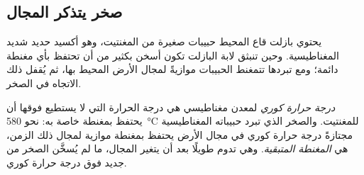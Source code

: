\subsection{صخر يتذكر المجال}

يحتوي بازلت قاع المحيط حبيبات صغيرة من المغنتيت، وهو أكسيد
حديد شديد المغناطيسية. وحين تنبثق لابة البازلت تكون أسخن بكثير من أن
تحتفظ بأي مغنطة دائمة؛ ومع تبردها تتمغنط الحبيبات
موازيةً لمجال الأرض المحيط بها، ثم يُقفل ذلك الاتجاه
في الصخر.

\begin{definition}\label{def:g11:drift-to-spreading:remanence}
\emph{درجة حرارة كوري} لمعدن مغناطيسي هي
درجة الحرارة التي لا يستطيع فوقها أن يحتفظ بمغنطة خاصة به: نحو
\qty{580}{\celsius} للمغنتيت. والصخر الذي تبرد حبيباته المغناطيسية مجتازةً
درجة حرارة كوري في مجال الأرض يحتفظ بمغنطة موازية
لمجال ذلك الزمن، هي
\emph{المغنطة المتبقية}. وهي تدوم طويلًا بعد أن يتغير المجال، ما لم يُسخَّن
الصخر من جديد فوق درجة حرارة كوري.
\end{definition}

